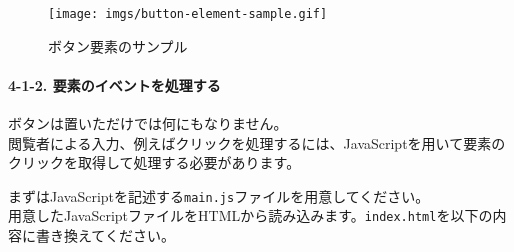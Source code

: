 \begin{figure}
\centering
\texttt{[image: imgs/button-element-sample.gif]}
\caption{ボタン要素のサンプル}
\end{figure}

\paragraph{4-1-2.
要素のイベントを処理する}\label{ux8981ux7d20ux306eux30a4ux30d9ux30f3ux30c8ux3092ux51e6ux7406ux3059ux308b}

ボタンは置いただけでは何にもなりません。\\
閲覧者による入力、例えばクリックを処理するには、JavaScriptを用いて要素のクリックを取得して処理する必要があります。

まずはJavaScriptを記述する\texttt{main.js}ファイルを用意してください。\\
用意したJavaScriptファイルをHTMLから読み込みます。\texttt{index.html}を以下の内容に書き換えてください。

\begin{Shaded}
\begin{Highlighting}[]
\DataTypeTok{\textgreater{}}
\DataTypeTok{\textless{}}\OperatorTok{=}\DataTypeTok{\textgreater{}}
  \DataTypeTok{\textless{}}\DataTypeTok{\textgreater{}}
    \DataTypeTok{\textless{}}\OperatorTok{=}\OtherTok{ }\DataTypeTok{/\textgreater{}}
    \DataTypeTok{\textless{}}\OperatorTok{=}\OperatorTok{=}\OtherTok{ }\DataTypeTok{/\textgreater{}}
    \DataTypeTok{\textless{}}\DataTypeTok{\textgreater{}}\DataTypeTok{\textless{}/}\DataTypeTok{\textgreater{}}
    \DataTypeTok{\textless{}}\OperatorTok{=}\DataTypeTok{\textgreater{}\textless{}/}\DataTypeTok{\textgreater{}}
  \DataTypeTok{\textless{}/}\DataTypeTok{\textgreater{}}
  \DataTypeTok{\textless{}}\DataTypeTok{\textgreater{}}
    \DataTypeTok{\textless{}}\OperatorTok{=}\DataTypeTok{\textgreater{}}\DataTypeTok{\textless{}/}\DataTypeTok{\textgreater{}}
  \DataTypeTok{\textless{}/}\DataTypeTok{\textgreater{}}
\DataTypeTok{\textless{}/}\DataTypeTok{\textgreater{}}
\end{Highlighting}
\end{Shaded}

